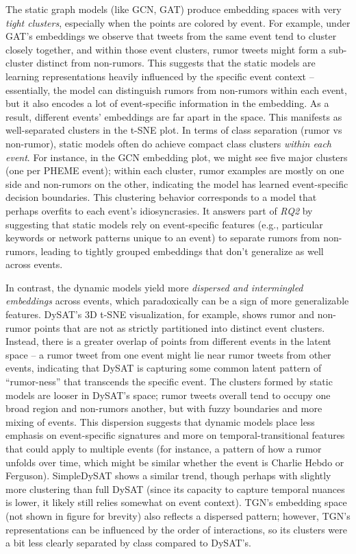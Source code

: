 \documentclass{cshonours}
\begin{document}
The static graph models (like GCN, GAT) produce embedding spaces with very \emph{tight clusters}, especially when the points are colored by event. For example, under GAT’s embeddings we observe that tweets from the same event tend to cluster closely together, and within those event clusters, rumor tweets might form a sub-cluster distinct from non-rumors. This suggests that the static models are learning representations heavily influenced by the specific event context – essentially, the model can distinguish rumors from non-rumors within each event, but it also encodes a lot of event-specific information in the embedding. As a result, different events’ embeddings are far apart in the space. This manifests as well-separated clusters in the t-SNE plot. In terms of class separation (rumor vs non-rumor), static models often do achieve compact class clusters \emph{within each event}. For instance, in the GCN embedding plot, we might see five major clusters (one per PHEME event); within each cluster, rumor examples are mostly on one side and non-rumors on the other, indicating the model has learned event-specific decision boundaries. This clustering behavior corresponds to a model that perhaps overfits to each event’s idiosyncrasies. It answers part of \emph{RQ2} by suggesting that static models rely on event-specific features (e.g., particular keywords or network patterns unique to an event) to separate rumors from non-rumors, leading to tightly grouped embeddings that don’t generalize as well across events.

In contrast, the dynamic models yield more \emph{dispersed and intermingled embeddings} across events, which paradoxically can be a sign of more generalizable features. DySAT’s 3D t-SNE visualization, for example, shows rumor and non-rumor points that are not as strictly partitioned into distinct event clusters. Instead, there is a greater overlap of points from different events in the latent space – a rumor tweet from one event might lie near rumor tweets from other events, indicating that DySAT is capturing some common latent pattern of “rumor-ness” that transcends the specific event. The clusters formed by static models are looser in DySAT’s space; rumor tweets overall tend to occupy one broad region and non-rumors another, but with fuzzy boundaries and more mixing of events. This dispersion suggests that dynamic models place less emphasis on event-specific signatures and more on temporal-transitional features that could apply to multiple events (for instance, a pattern of how a rumor unfolds over time, which might be similar whether the event is Charlie Hebdo or Ferguson). SimpleDySAT shows a similar trend, though perhaps with slightly more clustering than full DySAT (since its capacity to capture temporal nuances is lower, it likely still relies somewhat on event context). TGN’s embedding space (not shown in figure for brevity) also reflects a dispersed pattern; however, TGN’s representations can be influenced by the order of interactions, so its clusters were a bit less clearly separated by class compared to DySAT’s.
\end{document}
